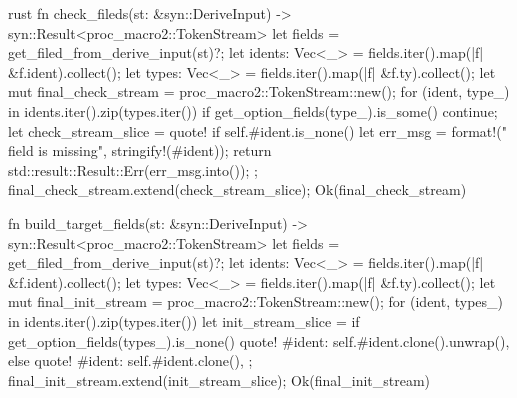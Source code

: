 \begin{code-block}{rust}
fn check_fileds(st: &syn::DeriveInput) -> syn::Result<proc_macro2::TokenStream> {
    let fields = get_filed_from_derive_input(st)?;
    let idents: Vec<_> = fields.iter().map(|f| &f.ident).collect();
    let types: Vec<_> = fields.iter().map(|f| &f.ty).collect();
    let mut final_check_stream = proc_macro2::TokenStream::new();
    for (ident, type_) in idents.iter().zip(types.iter()) {
        if get_option_fields(type_).is_some() {
            continue;
        }
        let check_stream_slice = quote! {
            if self.#ident.is_none() {
                let err_msg = format!("{} field is missing", stringify!(#ident));
                return std::result::Result::Err(err_msg.into());
            }
        };
        final_check_stream.extend(check_stream_slice);
    }
    Ok(final_check_stream)
}

fn build_target_fields(st: &syn::DeriveInput) -> syn::Result<proc_macro2::TokenStream> {
    let fields = get_filed_from_derive_input(st)?;
    let idents: Vec<_> = fields.iter().map(|f| &f.ident).collect();
    let types: Vec<_> = fields.iter().map(|f| &f.ty).collect();
    let mut final_init_stream = proc_macro2::TokenStream::new();
    for (ident, types_) in idents.iter().zip(types.iter()) {
        let init_stream_slice = if get_option_fields(types_).is_none() {
            quote! {
                #ident: self.#ident.clone().unwrap(),
            }
        } else {
            quote! {
                #ident: self.#ident.clone(),
            }
        };
        final_init_stream.extend(init_stream_slice);
    }
    Ok(final_init_stream)
}
\end{code-block}


